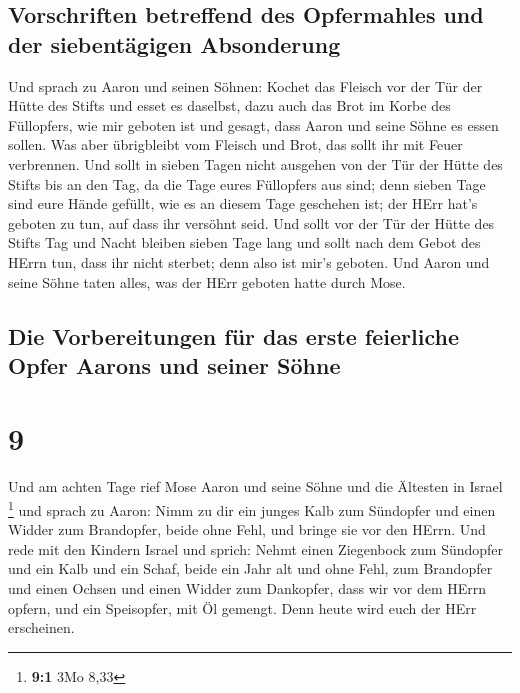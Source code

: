 \hypertarget{vorschriften-betreffend-des-opfermahles-und-der-siebentuxe4gigen-absonderung}{%
\subsection{Vorschriften betreffend des Opfermahles und der
siebentägigen
Absonderung}\label{vorschriften-betreffend-des-opfermahles-und-der-siebentuxe4gigen-absonderung}}

 Und sprach zu Aaron und seinen Söhnen: Kochet das
Fleisch vor der Tür der Hütte des Stifts und esset es daselbst, dazu
auch das Brot im Korbe des Füllopfers, wie mir geboten ist und gesagt,
dass Aaron und seine Söhne es essen sollen.  Was aber
übrigbleibt vom Fleisch und Brot, das sollt ihr mit Feuer verbrennen.
 Und sollt in sieben Tagen nicht ausgehen von der Tür der
Hütte des Stifts bis an den Tag, da die Tage eures Füllopfers aus sind;
denn sieben Tage sind eure Hände gefüllt,  wie es an
diesem Tage geschehen ist; der HErr hat's geboten zu tun, auf dass ihr
versöhnt seid.  Und sollt vor der Tür der Hütte des
Stifts Tag und Nacht bleiben sieben Tage lang und sollt nach dem Gebot
des HErrn tun, dass ihr nicht sterbet; denn also ist mir's geboten.
 Und Aaron und seine Söhne taten alles, was der HErr
geboten hatte durch Mose.

\hypertarget{die-vorbereitungen-fuxfcr-das-erste-feierliche-opfer-aarons-und-seiner-suxf6hne}{%
\subsection{Die Vorbereitungen für das erste feierliche Opfer Aarons und
seiner
Söhne}\label{die-vorbereitungen-fuxfcr-das-erste-feierliche-opfer-aarons-und-seiner-suxf6hne}}

\hypertarget{section-8}{%
\section{9}\label{section-8}}

 Und am achten Tage rief Mose Aaron und seine Söhne und
die Ältesten in Israel \footnote{\textbf{9:1} 3Mo 8,33} 
und sprach zu Aaron: Nimm zu dir ein junges Kalb zum Sündopfer und einen
Widder zum Brandopfer, beide ohne Fehl, und bringe sie vor den HErrn.
 Und rede mit den Kindern Israel und sprich: Nehmt einen
Ziegenbock zum Sündopfer und ein Kalb und ein Schaf, beide ein Jahr alt
und ohne Fehl, zum Brandopfer  und einen Ochsen und einen
Widder zum Dankopfer, dass wir vor dem HErrn opfern, und ein Speisopfer,
mit Öl gemengt. Denn heute wird euch der HErr erscheinen.

